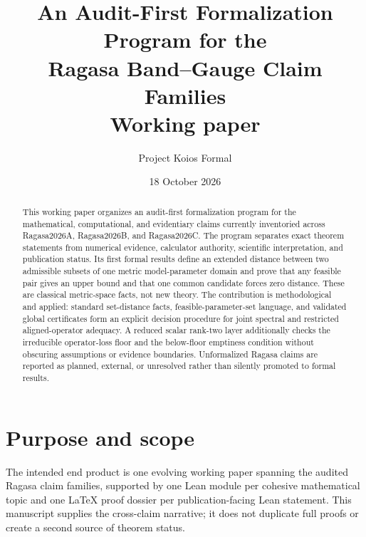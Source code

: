\documentclass[11pt]{article}
\title{An Audit-First Formalization Program for the\\Ragasa Band--Gauge Claim Families\\\large Working paper}
\author{Project Koios Formal}
\date{18 October 2026}
\begin{document}
\maketitle

\begin{center}
\end{center}

\begin{abstract}
This working paper organizes an audit-first formalization program for the mathematical,
computational, and evidentiary claims currently inventoried across Ragasa2026A,
Ragasa2026B, and Ragasa2026C. The program separates exact theorem statements from
numerical evidence, calculator authority, scientific interpretation, and publication
status. Its first formal results define an extended distance between two admissible
subsets of one metric model-parameter domain and prove that any feasible pair gives an
upper bound and that one common candidate forces zero distance. These are classical
metric-space facts, not new theory. The contribution is methodological and applied: standard set-distance facts,
feasible-parameter-set language, and validated global certificates form an explicit
decision procedure for joint spectral
and restricted aligned-operator adequacy. A reduced scalar rank-two layer additionally
checks the irreducible operator-loss floor and the below-floor emptiness condition without
obscuring assumptions or evidence boundaries. Unformalized Ragasa claims are reported as
planned, external, or unresolved rather than silently promoted to formal results.
\end{abstract}

\section{Purpose and scope}

The intended end product is one evolving working paper spanning the audited Ragasa claim
families, supported by one Lean module per cohesive mathematical topic and one LaTeX
proof dossier per publication-facing Lean statement. This manuscript supplies
the cross-claim narrative; it does not duplicate full proofs or create a second source
of theorem status.
\end{document}
